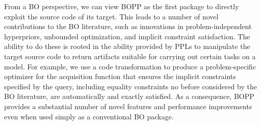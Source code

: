 From a BO perspective, we can view BOPP as the first package to directly exploit the source code of its target.
This leads to a number of novel contributions to the BO literature, such as innovations in 
problem-independent hyperpriors, unbounded optimization, and implicit constraint satisfaction.  
The ability to do these is rooted
in the ability provided by PPLs to manipulate the target source code to return artifacts suitable for carrying
out certain tasks on a model.  For example, we use a code transformation to produce a problem-specific
optimizer for the acquisition function that ensures the implicit constraints specified by the query,
including equality constraints no before considered by the BO literature, are automatically and exactly
satisfied.  As a consequence, BOPP provides a substantial number of novel features and performance
improvements even when used simply as a conventional BO package.